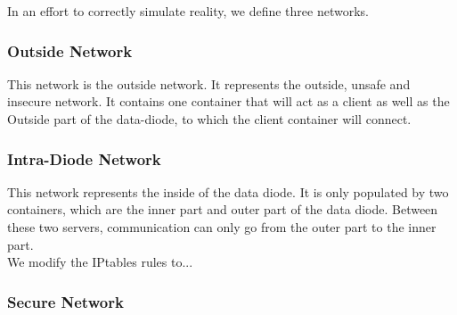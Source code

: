 \documentclass[a4paper,11pt]{article}
\begin{document}
In an effort to correctly simulate reality, we define three networks.

\subsubsection{Outside Network}
This network is the outside network. It represents the outside, unsafe and insecure network. It contains one container that will act as a client as well as the Outside part of the data-diode, to which the client container will connect.

\subsubsection{Intra-Diode Network}
This network represents the inside of the data diode. It is only populated by two containers, which are the inner part and outer part of the data diode. Between these two servers, communication can only go from the outer part to the inner part.\\

We modify the IPtables rules to...

\subsubsection{Secure Network}
\end{document}
